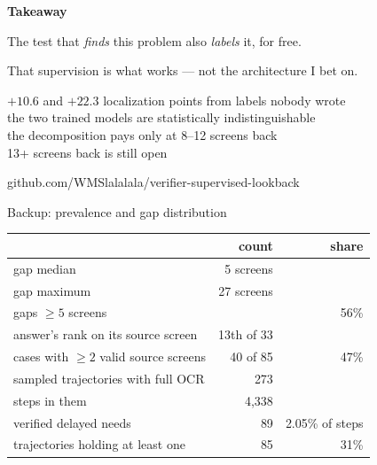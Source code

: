 \documentclass[aspectratio=169,10pt]{beamer}
\begin{document}
{
\begin{frame}[plain]
\vspace{0.7cm}
{\color{white}\Large\bfseries Takeaway\par}
\vspace{0.6cm}
{\color{white}\large
The test that \emph{finds} this problem also \emph{labels} it, for free.\par
\vspace{0.4em}
That supervision is what works --- not the architecture I bet on.\par}
\vspace{0.8cm}
{\color{white!88!wolfred}\normalsize
$+10.6$ and $+22.3$ localization points from labels nobody wrote\\[0.25em]
the two trained models are statistically indistinguishable\\[0.25em]
the decomposition pays only at 8--12 screens back\\[0.25em]
13+ screens back is still open\par}
\vspace{0.7cm}
{\color{white!80!wolfred}\small github.com/WMSlalalala/verifier-supervised-lookback\par}
\end{frame}}

\appendix
\begin{frame}{Backup: prevalence and gap distribution}
\vspace{0.4cm}
\centering\small
\begin{tabular}{lrr}
\toprule
& count & share\\
\midrule
gap median & 5 screens & \\
gap maximum & 27 screens & \\
gaps $\ge5$ screens & & 56\%\\
answer's rank on its source screen & 13th of 33 & \\
cases with $\ge2$ valid source screens & 40 of 85 & 47\%\\
\midrule
sampled trajectories with full OCR & 273 & \\
steps in them & 4,338 & \\
verified delayed needs & 89 & 2.05\% of steps\\
trajectories holding at least one & 85 & 31\%\\
\bottomrule
\end{tabular}
\end{frame}
\end{document}
